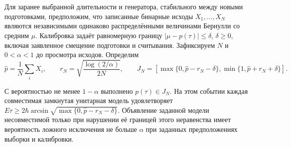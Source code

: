 \section{}\label{sec:sampling}
{Для заранее выбранной длительности и генератора, стабильного между новыми подготовками, предположим, что записанные бинарные исходы $X_1,\ldots,X_N$ являются независимыми одинаково распределёнными величинами Бернулли со средним $\mu$. Калибровка задаёт равномерную границу $|\mu-p(\tau)|\leq\delta$, $\delta\geq0$, включая заявленное смещение подготовки и считывания. Зафиксируем $N$ и $0<\alpha<1$ до просмотра исходов. Определим}
\begin{equation}\label{eq:confidence}
 \widehat p=\frac1N\sum_iX_i,\qquad
 r_N=\sqrt{\frac{\log(2/\alpha)}{2N}},\qquad
 J_N=[\max\{0,\widehat p-r_N-\delta\},\min\{1,\widehat p+r_N+\delta\}].
\end{equation}
\begin{proposition}\label{prop:confidence}
{С вероятностью не менее $1-\alpha$ выполнено $p(\tau)\in J_N$. На этом событии каждая совместимая замкнутая унитарная модель удовлетворяет $E\tau\geq2\hbar\arcsin\sqrt{\max\{0,\widehat p-r_N-\delta\}}$. Объявление заданной модели несовместимой только при нарушении её границей этого неравенства имеет вероятность ложного исключения не больше $\alpha$ при заданных предположениях выборки и калибровки.}
\end{proposition}
